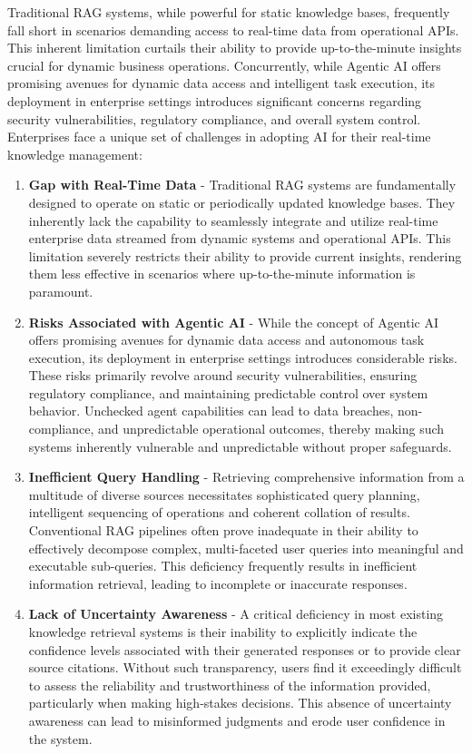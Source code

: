 \documentclass[default]{sn-jnl}%
\begin{document}
Traditional RAG systems, while powerful for static knowledge bases, frequently fall short in scenarios demanding access to real-time data from operational APIs. This inherent limitation curtails their ability to provide up-to-the-minute insights crucial for dynamic business operations. Concurrently, while Agentic AI offers promising avenues for dynamic data access and intelligent task execution, its deployment in enterprise settings introduces significant concerns regarding security vulnerabilities, regulatory compliance, and overall system control. Enterprises face a unique set of challenges in adopting AI for their real-time knowledge management:

\begin{enumerate}
    \item \textbf{Gap with Real-Time Data} - Traditional RAG systems are fundamentally designed to operate on static or periodically updated knowledge bases. They inherently lack the capability to seamlessly integrate and utilize real-time enterprise data streamed from dynamic systems and operational APIs. This limitation severely restricts their ability to provide current insights, rendering them less effective in scenarios where up-to-the-minute information is paramount.
    \item \textbf{Risks Associated with Agentic AI} - While the concept of Agentic AI offers promising avenues for dynamic data access and autonomous task execution, its deployment in enterprise settings introduces considerable risks. These risks primarily revolve around security vulnerabilities, ensuring regulatory compliance, and maintaining predictable control over system behavior. Unchecked agent capabilities can lead to data breaches, non-compliance, and unpredictable operational outcomes, thereby making such systems inherently vulnerable and unpredictable without proper safeguards.
    \item \textbf{Inefficient Query Handling} - Retrieving comprehensive information from a multitude of diverse sources necessitates sophisticated query planning, intelligent sequencing of operations and coherent collation of results. Conventional RAG pipelines often prove inadequate in their ability to effectively decompose complex, multi-faceted user queries into meaningful and executable sub-queries. This deficiency frequently results in inefficient information retrieval, leading to incomplete or inaccurate responses.
    \item \textbf{Lack of Uncertainty Awareness} - A critical deficiency in most existing knowledge retrieval systems is their inability to explicitly indicate the confidence levels associated with their generated responses or to provide clear source citations. Without such transparency, users find it exceedingly difficult to assess the reliability and trustworthiness of the information provided, particularly when making high-stakes decisions. This absence of uncertainty awareness can lead to misinformed judgments and erode user confidence in the system.

\end{enumerate}
\end{document}
